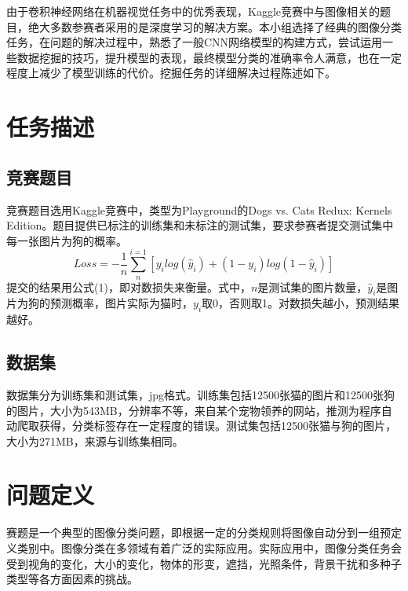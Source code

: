 \documentclass[10.5pt,twocolumn]{jbuaa}
\begin{document}
\wuhao


由于卷积神经网络在机器视觉任务中的优秀表现，Kaggle竞赛中与图像相关的题目，绝大多数参赛者采用的是深度学习的解决方案。本小组选择了经典的图像分类任务，在问题的解决过程中，熟悉了一般CNN网络模型的构建方式，尝试运用一些数据挖掘的技巧，提升模型的表现，最终模型分类的准确率令人满意，也在一定程度上减少了模型训练的代价。挖掘任务的详细解决过程陈述如下。

\section{任务描述}
\subsection{竞赛题目}
竞赛题目选用Kaggle竞赛中，类型为Playground的Dogs vs. Cats Redux: Kernels Edition。题目提供已标注的训练集和未标注的测试集，要求参赛者提交测试集中每一张图片为狗的概率。\enlargethispage{-3.3cm}
\begin{equation}
\label{eqnLabel}
Loss=-\frac 1 n\sum_{n}^{i=1}[y_ilog(\hat y_i)+(1-y_i)log(1-\hat y_i)]
\end{equation}
提交的结果用公式(1)，即对数损失来衡量。式中，$n$是测试集的图片数量，$\hat y_i$是图片为狗的预测概率，图片实际为猫时，$y_i$取0，否则取1。对数损失越小，预测结果越好。
\subsection{数据集}
数据集分为训练集和测试集，jpg格式。训练集包括12500张猫的图片和12500张狗的图片，大小为543MB，分辨率不等，来自某个宠物领养的网站，推测为程序自动爬取获得，分类标签存在一定程度的错误。测试集包括12500张猫与狗的图片，大小为271MB，来源与训练集相同。

\section{问题定义}
赛题是一个典型的图像分类问题，即根据一定的分类规则将图像自动分到一组预定义类别中。图像分类在多领域有着广泛的实际应用。实际应用中，图像分类任务会受到视角的变化，大小的变化，物体的形变，遮挡，光照条件，\enlargethispage{-3.3cm}背景干扰和多种子类型等各方面因素的挑战。
\end{document}
